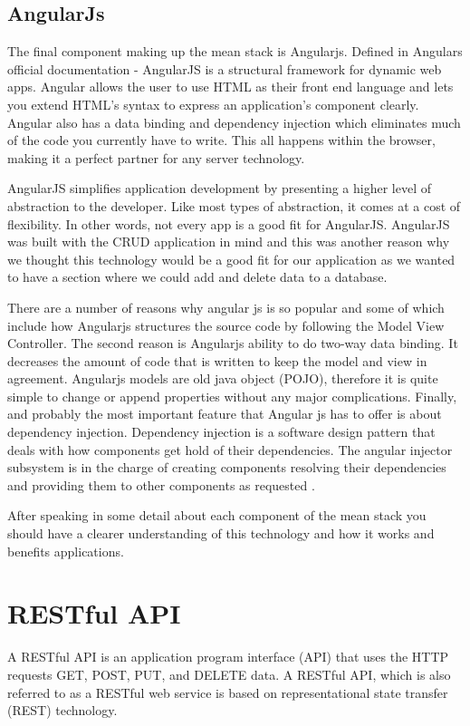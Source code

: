 \subsection{AngularJs}
The final component making up the mean stack is Angularjs. Defined in Angulars official documentation\cite{angularjs} - AngularJS is a structural framework for dynamic
web apps. Angular allows the user to use HTML as their front end language and lets you extend HTML’s syntax to express an application’s component clearly. Angular also has a data binding and dependency injection which eliminates much
of the code you currently have to write. This all happens within the
browser, making it a perfect partner for any server technology.

AngularJS simplifies application development by presenting a higher level of abstraction to the developer. Like most types of abstraction, it comes at a cost of flexibility. In other words, not every app is a good fit for AngularJS. AngularJS was built with the CRUD application in mind and this was another reason why we thought this technology would be a good fit for our application as we wanted to have a section where we could add and delete data to a database. \cite{angularjsa}
 
There are a number of reasons why angular js is so popular and some of which include how Angularjs structures the source code by following
the Model View Controller. The second reason is  Angularjs ability to do two-way data binding. It decreases the amount of code
that is written to keep the model and view in agreement.  Angularjs
models are old java object (POJO), therefore it is quite simple to change or
append properties without any major complications. Finally, and probably the most important
feature that Angular js has to offer is about dependency injection. Dependency injection
is a software design pattern that deals with how components get hold of
their dependencies. The angular injector subsystem is in the charge of creating
components resolving their dependencies and providing them to other
components as requested \cite{angularjsfeat}.

After speaking in some detail about each component of the mean stack you should have a clearer understanding of this technology and how it works and benefits applications.  

\section{RESTful API}
A RESTful API is an application program interface (API) that uses the HTTP requests GET, POST, PUT, and DELETE data. A RESTful API, which is also referred to as a RESTful web service is based on representational state transfer (REST) technology\cite{Restapi}. 

